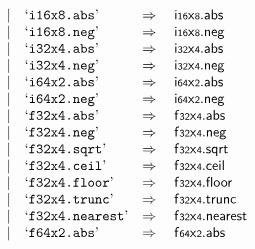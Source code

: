 $$\begin{array}[t]{@{}lrrl@{}l@{}l@{}l@{}}
& & | & \mbox{‘\texttt{i16x8.abs}’} & \quad\Rightarrow\quad{} & {\mathsf{i{\scriptstyle 16}}}{\mathsf{x}}{\mathsf{{\scriptstyle 8}}} {.} \mathsf{abs} \\
& & | & \mbox{‘\texttt{i16x8.neg}’} & \quad\Rightarrow\quad{} & {\mathsf{i{\scriptstyle 16}}}{\mathsf{x}}{\mathsf{{\scriptstyle 8}}} {.} \mathsf{neg} \\
& & | & \mbox{‘\texttt{i32x4.abs}’} & \quad\Rightarrow\quad{} & {\mathsf{i{\scriptstyle 32}}}{\mathsf{x}}{\mathsf{{\scriptstyle 4}}} {.} \mathsf{abs} \\
& & | & \mbox{‘\texttt{i32x4.neg}’} & \quad\Rightarrow\quad{} & {\mathsf{i{\scriptstyle 32}}}{\mathsf{x}}{\mathsf{{\scriptstyle 4}}} {.} \mathsf{neg} \\
& & | & \mbox{‘\texttt{i64x2.abs}’} & \quad\Rightarrow\quad{} & {\mathsf{i{\scriptstyle 64}}}{\mathsf{x}}{\mathsf{{\scriptstyle 2}}} {.} \mathsf{abs} \\
& & | & \mbox{‘\texttt{i64x2.neg}’} & \quad\Rightarrow\quad{} & {\mathsf{i{\scriptstyle 64}}}{\mathsf{x}}{\mathsf{{\scriptstyle 2}}} {.} \mathsf{neg} \\
& & | & \mbox{‘\texttt{f32x4.abs}’} & \quad\Rightarrow\quad{} & {\mathsf{f{\scriptstyle 32}}}{\mathsf{x}}{\mathsf{{\scriptstyle 4}}} {.} \mathsf{abs} \\
& & | & \mbox{‘\texttt{f32x4.neg}’} & \quad\Rightarrow\quad{} & {\mathsf{f{\scriptstyle 32}}}{\mathsf{x}}{\mathsf{{\scriptstyle 4}}} {.} \mathsf{neg} \\
& & | & \mbox{‘\texttt{f32x4.sqrt}’} & \quad\Rightarrow\quad{} & {\mathsf{f{\scriptstyle 32}}}{\mathsf{x}}{\mathsf{{\scriptstyle 4}}} {.} \mathsf{sqrt} \\
& & | & \mbox{‘\texttt{f32x4.ceil}’} & \quad\Rightarrow\quad{} & {\mathsf{f{\scriptstyle 32}}}{\mathsf{x}}{\mathsf{{\scriptstyle 4}}} {.} \mathsf{ceil} \\
& & | & \mbox{‘\texttt{f32x4.floor}’} & \quad\Rightarrow\quad{} & {\mathsf{f{\scriptstyle 32}}}{\mathsf{x}}{\mathsf{{\scriptstyle 4}}} {.} \mathsf{floor} \\
& & | & \mbox{‘\texttt{f32x4.trunc}’} & \quad\Rightarrow\quad{} & {\mathsf{f{\scriptstyle 32}}}{\mathsf{x}}{\mathsf{{\scriptstyle 4}}} {.} \mathsf{trunc} \\
& & | & \mbox{‘\texttt{f32x4.nearest}’} & \quad\Rightarrow\quad{} & {\mathsf{f{\scriptstyle 32}}}{\mathsf{x}}{\mathsf{{\scriptstyle 4}}} {.} \mathsf{nearest} \\
& & | & \mbox{‘\texttt{f64x2.abs}’} & \quad\Rightarrow\quad{} & {\mathsf{f{\scriptstyle 64}}}{\mathsf{x}}{\mathsf{{\scriptstyle 2}}} {.} \mathsf{abs} \\

\end{array}$$
